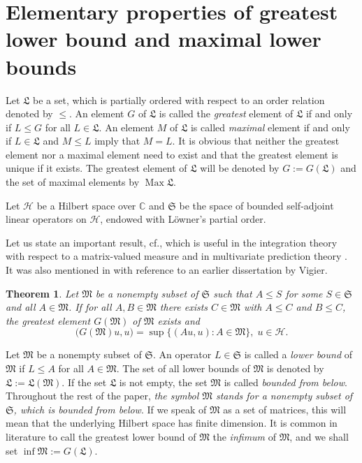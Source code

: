 \documentclass[12pt, a4paper, reqno, twoside]{amsart}
\numberwithin{equation}{section}
\DeclareMathOperator{\Max}{Max}
\newcommand{\frakS}{\mathfrak S}
\newcommand{\frakL}{\mathfrak L}
\newcommand{\frakM}{\mathfrak M}
\newcommand{\cf}{\mbox{cf.}\xspace}
\newtheorem{theorem}{Theorem}[section]
\theoremstyle{definition}
\theoremstyle{remark}
\theoremstyle{mystyle}
\begin{document}
\section{Elementary properties of greatest lower bound 
and maximal lower bounds}
\label{sec2}

Let $\frakL$ be a set, which is partially ordered with respect to an
order relation denoted by $\leq$. An element $G$ of $\frakL$ is called
the \emph{greatest} element of $\frakL$ if and only if $L\leq G$ for all
$L\in\frakL$. An element $M$ of $\frakL$ is called \emph{maximal}
element if and only if $L\in\frakL$ and $M\leq L$ imply that $M=L$. It
is obvious that neither the greatest element nor a maximal element need
to exist and that the greatest element is unique if it exists. The
greatest element of $\frakL$ will be denoted by $G:=G(\frakL)$ and the
set of maximal elements by $\Max\frakL$.

Let $\mathscr H$ be a Hilbert space over $\mathbb C$ and $\frakS$ be
the space of bounded self-adjoint linear operators on $\mathscr H$,
endowed with L\"owner's partial order.

Let us state an important result, \cf \cite[Thm.~3.2]{Shmulyan1959},
which is useful in the integration theory with respect to a
matrix-valued measure \cite{Shmulyan1959} and in multivariate
prediction theory \cite{Klotz2002}. It was also mentioned in
\cite[Appendix II]{Dixmier1981} with reference to an earlier
dissertation by Vigier.

\begin{theorem}
\label{thm2.1a}
Let $\frakM$ be a nonempty subset of $\frakS$ such that $A\leq S$ for
some $S\in\frakS$ and all $A\in\frakM$. If for all $A,B\in\frakM$
there exists $C\in\frakM$ with $A\leq C$ and $B\leq C$, the greatest
element $G(\frakM)$ of $\frakM$ exists and
\begin{equation}
\label{eq2.1a}
\bigl(G(\frakM)u,u\bigr)=\sup\bigl\{(Au,u) : A\in\frakM\bigr\},
\; u\in\mathscr H.
\end{equation}
\end{theorem}

Let $\frakM$ be a nonempty subset of $\frakS$. An operator
$L\in\frakS$ is called a \emph{lower bound} of $\frakM$ if $L\leq A$
for all $A\in\frakM$. The set of all lower bounds of $\frakM$ is
denoted  by $\frakL:=\frakL(\frakM)$. If the set $\frakL$ is not
empty,  the set $\frakM$ is called \emph{bounded from below}.
Throughout the rest of the paper, \emph{the symbol $\frakM$
stands for a nonempty subset of $\frakS$, which is bounded from
below}. If we speak of $\frakM$ as a set of matrices, this will mean
that the underlying Hilbert space has finite dimension. It is common
in literature to call the greatest lower bound of $\frakM$ the
\emph{infimum} of $\frakM$, and we shall set $\inf\frakM:=G(\frakL)$.
\end{document}

